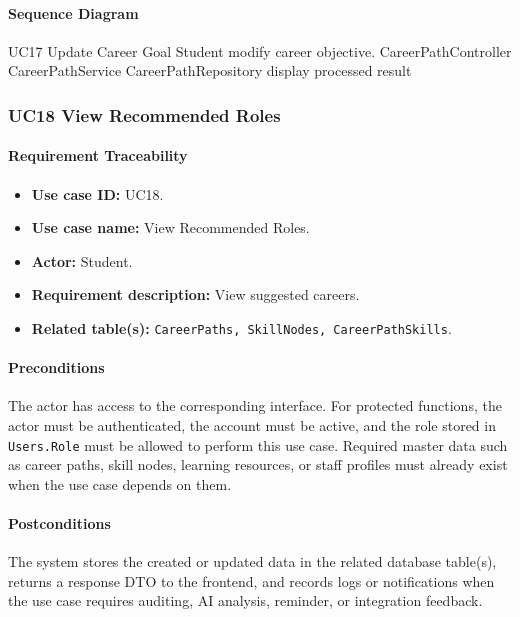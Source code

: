 \paragraph{Sequence Diagram}

\SequenceDiagram
{UC17 Update Career Goal}
{Student}
{modify career objective.}
{CareerPathController}
{CareerPathService}
{CareerPathRepository}
{display processed result}

\subsubsection{UC18 View Recommended Roles}

\paragraph{Requirement Traceability}

\begin{itemize}
    \item \textbf{Use case ID:} UC18.
    \item \textbf{Use case name:} View Recommended Roles.
    \item \textbf{Actor:} Student.
    \item \textbf{Requirement description:} View suggested careers.
    \item \textbf{Related table(s):} \texttt{CareerPaths, SkillNodes, CareerPathSkills}.
\end{itemize}

\paragraph{Preconditions}

The actor has access to the corresponding interface. For protected functions, the actor must be authenticated, the account must be active, and the role stored in \texttt{Users.Role} must be allowed to perform this use case. Required master data such as career paths, skill nodes, learning resources, or staff profiles must already exist when the use case depends on them.

\paragraph{Postconditions}

The system stores the created or updated data in the related database table(s), returns a response DTO to the frontend, and records logs or notifications when the use case requires auditing, AI analysis, reminder, or integration feedback.

